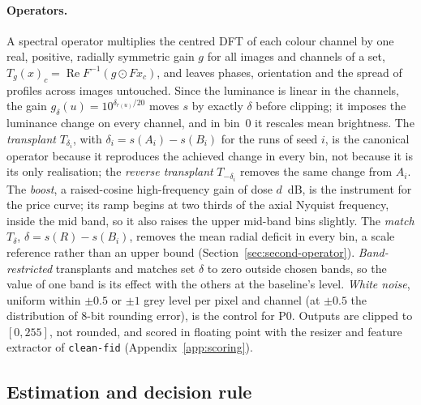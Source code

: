 \paragraph{Operators.}
A spectral operator multiplies the centred DFT of each colour channel by one
real, positive, radially symmetric gain $g$ for all images and channels of a
set, $T_g(x)_c = \operatorname{Re} F^{-1}(g \odot F x_c)$, and leaves phases,
orientation and the spread of profiles across images untouched. Since the
luminance is linear in the channels, the gain
$g_\delta(u) = 10^{\delta_{r(u)}/20}$ moves $s$ by exactly $\delta$ before
clipping; it imposes the luminance change on every channel, and in bin~0 it
rescales mean brightness. The \emph{transplant} $T_{\delta_i}$, with
$\delta_i = s(A_i) - s(B_i)$ for the runs of seed $i$, is the canonical
operator because it reproduces the achieved change in every bin, not because
it is its only realisation; the \emph{reverse transplant} $T_{-\delta_i}$
removes the same change from $A_i$. The \emph{boost}, a raised-cosine
high-frequency gain of dose $d$~dB, is the instrument for the price curve;
its ramp begins at two thirds of the axial Nyquist frequency, inside the mid
band, so it also raises the upper mid-band bins slightly. The \emph{match}
$T_\delta$, $\delta = s(R) - s(B_i)$, removes the mean radial deficit in
every bin, a scale reference rather than an upper bound
(Section~\ref{sec:second-operator}). \emph{Band-restricted} transplants and
matches set $\delta$ to zero outside chosen bands, so the value of one band
is its effect with the others at the baseline's level. \emph{White noise},
uniform within $\pm 0.5$ or $\pm 1$ grey level per pixel and channel (at
$\pm 0.5$ the distribution of 8-bit rounding error), is the control for P0.
Outputs are clipped to $[0, 255]$, not rounded, and scored in floating point
with the resizer and feature extractor of \texttt{clean-fid}
\citep{parmar2022aliased} (Appendix~\ref{app:scoring}).

\subsection{Estimation and decision rule}
\label{sec:pricing-est}

